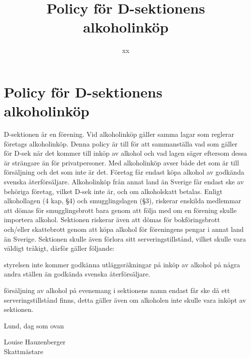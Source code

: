 \documentclass{dsekkallelse}
\title{Policy för D-sektionens alkoholinköp}
\author{xx}
\begin{document}
\section{Policy för D-sektionens alkoholinköp}

D-sektionen är en förening. Vid alkoholinköp gäller samma lagar som reglerar
företags alkoholinköp. Denna policy är till för att sammanställa vad som gäller för D-sek när
det kommer till inköp av alkohol och vad lagen säger eftersom dessa är strängare än för privatpersoner. Med alkoholinköp avser både det som är till försäljning och det som inte är det.
Företag får endast köpa alkohol av godkända svenska återförsäljare. Alkoholinköp från annat
land än Sverige får endast ske av behöriga företag, vilket D-sek inte är, och om alkoholskatt
betalas. Enligt alkohollagen (4 kap, §4) och smugglingslagen (§3), riskerar enskilda medlemmar att dömas för smugglingsbrott bara genom att följa med om en förening skulle importera
alkohol. Sektionen riskerar även att dömas för bokföringsbrott och/eller skattebrott genom att
köpa alkohol för föreningens pengar i annat land än Sverige. Sektionen skulle även förlora sitt
serveringstillstånd, vilket skulle vara väldigt tråkigt, därför gäller följande:
\begin{attlista}
	\item styrelsen inte kommer godkänna utläggsräkningar på inköp av alkohol på några andra ställen än godkända svenska återförsäljare.
\item försäljning av alkohol på evenemang i sektionens namn endast får ske då ett serveringstillstånd finns, detta gäller även om alkoholen inte skulle vara inköpt av sektionen.

\end{attlista}



Lund, dag som ovan\newline

Louise Hauzenberger\\
Skattmästare
\end{document}
